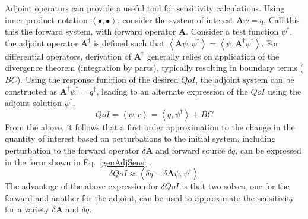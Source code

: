 \documentclass{article}
\newcommand{\bra}{\left\langle}
\newcommand{\ket}{\right\rangle}
\newcommand{\qoi}{QoI}
\begin{document}
Adjoint operators can provide a useful tool for sensitivity calculations. Using inner product notation $\bra \bullet , \bullet \ket$, consider the system of interest $\mathbf{A} \psi = q$. Call this this the forward system, with forward operator $\mathbf{A}$. Consider a test function $\psi^\dag$, the adjoint operator $\mathbf{A^\dag}$ is defined such that $\bra \mathbf{A} \psi, \psi^\dag \ket = \bra \psi, \mathbf{A^\dag} \psi^\dag \ket $. For differential operators, derivation of $\mathbf{A^\dag}$ generally relies on application of the divergence theorem (integration by parts), typically resulting in boundary terms ($BC$). Using the response function of the desired $\qoi$, the adjoint system can be constructed as $\mathbf{A^\dag} \psi^\dag = q^\dag$, leading to an alternate expression of the $\qoi$ using the adjoint solution $\psi^\dag $.
\begin{equation}
\label{genAdjQoI}
\qoi = \bra \psi, r \ket = \bra q , \psi^\dag \ket + BC
\end{equation} 
From the above, it follows that a first order approximation to the change in the quantity of interest based on perturbations to the initial system, including perturbation to the forward operator $\delta \mathbf{A}$ and forward source $\delta q$, can be expressed in the form shown in Eq.~\eqref{genAdjSens} \cite{Marchuk}.
\begin{equation}
\label{genAdjSens}
\delta \qoi \approx \bra \delta q - \delta \mathbf{A} \psi , \psi^\dag \ket 
\end{equation}
The advantage of the above expression for $\delta \qoi$ is that two solves, one for the forward and another for the adjoint, can be used to approximate the sensitivity for a variety $\delta \mathbf{A}$ and $\delta q$.

 
\end{document}
